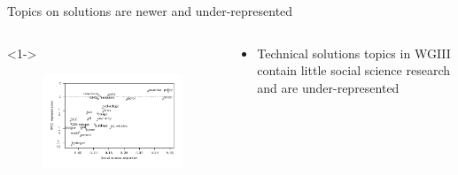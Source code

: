 \documentclass[9pt, aspectratio=169]{beamer}
\begin{document}
\begin{frame}{Topics on solutions are newer and under-represented}

\vspace{-0.5cm}

\begin{columns}
	
	\begin{column}{0.618\linewidth}<1->
		\begin{figure}[h!]
			\begin{center}
				\includegraphics[width=\linewidth]{../plots/run_1861_wg3_socsci.pdf}
			\end{center}
		\end{figure}
		
	\end{column}
	\begin{column}{0.382\linewidth}
		\begin{itemize}
			\item<1-> Technical solutions topics in WGIII contain little social science research and are under-represented
			
			
		\end{itemize}
	\end{column}
\end{columns}
\end{frame}
\end{document}
